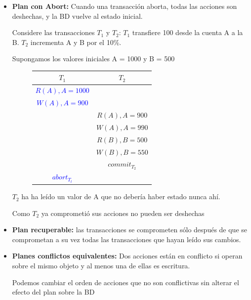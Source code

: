 \documentclass{templateNote}
\begin{document}
\begin{itemize}
\begin{itemize}
        \newpage
        \item \textbf{Plan con Abort:} Cuando una transacción aborta, todas las acciones son deshechas, y la BD vuelve al estado inicial.
        
        Considere las transacciones $T_1$ y $T_2$:
        \subitem $T_1$ transfiere 100 desde la cuenta A a la B.
        \subitem $T_2$ incrementa A y B por el 10\%.
        
        Supongamos los valores iniciales A = 1000 y B = 500
         
        \begin{figure}[H]
            \centering
            \begin{tabular}{|c|c|}
                \hline
                \textbf{$T_1$} & \textbf{$T_2$} \\ \hline
                \textcolor{blue}{$R(A), A = 1000$} & \\
                \textcolor{blue}{$W(A), A = 900$} & \\
                & \textcolor{green!80!black}{$R(A), A = 900$} \\
                & \textcolor{green!80!black}{$W(A), A = 990$} \\
                & \textcolor{green!80!black}{$R(B), B = 500$} \\
                & \textcolor{green!80!black}{$W(B), B = 550$} \\
                & \textcolor{green!80!black}{\textit{$commit_{T_2}$}} \\
                \textcolor{blue}{$abort_{T_t}$} & \\ \hline
            \end{tabular}
        \end{figure}

        $T_2$ ha ha leído un valor de A que no debería haber estado nunca ahí.

        Como $T_2$ ya comprometió sus acciones no pueden ser deshechas

        \item \textbf{Plan recuperable:} las transacciones se comprometen sólo después de que se comprometan a su vez todas las transacciones que hayan leído sus cambios.
        
        \item \textbf{Planes conflictos equivalentes:} Dos acciones están en conflicto si operan sobre el mismo objeto y al menos una de ellas es escritura.
        
        Podemos cambiar el orden de acciones que no son conflictivas sin alterar el efecto del plan sobre la BD
        

\end{itemize}
\end{itemize}
\end{document}
